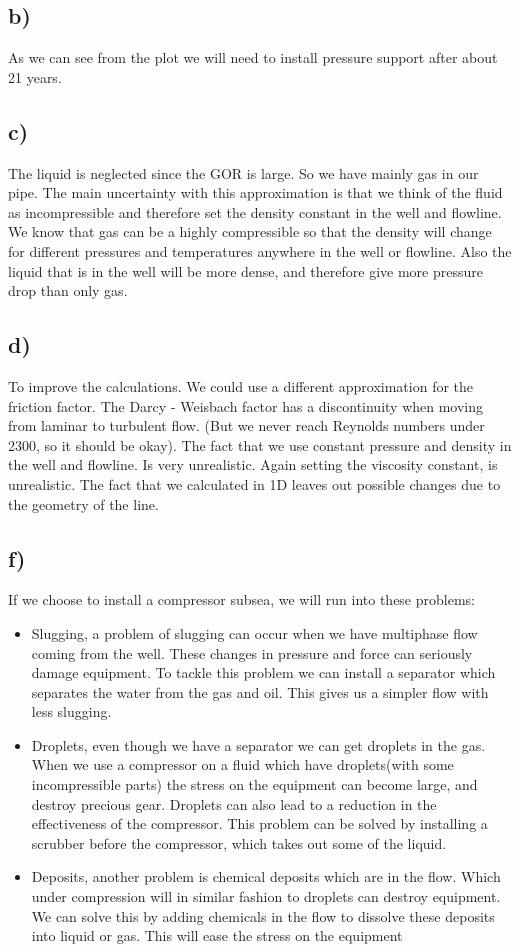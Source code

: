 \documentclass[DIV=calc, paper=a4, fontsize=13pt, twocolumn]{scrartcl}	 %
\begin{document}
\subsection*{b)}
As we can see from the plot we will need to install pressure support after about 21 years.
\subsection*{c)}
The liquid is neglected since the GOR is large. So we have mainly gas in our pipe. The main uncertainty with this approximation is that we think of the fluid as incompressible and therefore set the density constant in the well and flowline. We know that gas can be a highly compressible so that the density will change for different pressures and temperatures anywhere in the well or flowline.
\newline
Also the liquid that is in the well will be more dense, and therefore give more pressure drop than only gas.
\subsection*{d)}
To improve the calculations. We could use a different approximation for the friction factor. The Darcy - Weisbach factor has a discontinuity when moving from laminar to turbulent flow. (But we never reach Reynolds numbers under 2300, so it should be okay). 
\newline
The fact that we use constant pressure and density in the well and flowline. Is very unrealistic. Again setting the viscosity constant, is unrealistic.
\newline
The fact that we calculated in 1D leaves out possible changes due to the geometry of the line.
\subsection*{f)}
If we choose to install a compressor subsea, we will run into these problems:
\begin{itemize}
\item Slugging, a problem of slugging can occur when we have multiphase flow coming from the well. These changes in pressure and force can seriously damage equipment. To tackle this problem we can install a separator which separates the water from the gas and oil. This gives us a simpler flow with less slugging.
\item Droplets, even though we have a separator we can get droplets in the gas. When we use a compressor on a fluid which have droplets(with some incompressible parts) the stress on the equipment can become large, and destroy precious gear. Droplets can also lead to a reduction in the effectiveness of the compressor. This problem can be solved by installing a scrubber before the compressor, which takes out some of the liquid.
\item Deposits, another problem is chemical deposits which are in the flow. Which under compression will in similar fashion to droplets can destroy equipment. We can solve this by adding chemicals in the flow to dissolve these deposits into liquid or gas. This will ease the stress on the equipment
\end{itemize}
\end{document}

